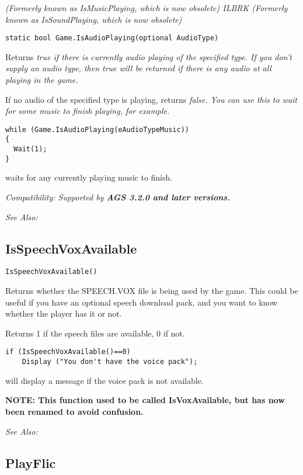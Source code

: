 \it{(Formerly known as IsMusicPlaying, which is now obsolete)} ILBRK
\it{(Formerly known as IsSoundPlaying, which is now obsolete)}

\begin{verbatim}
static bool Game.IsAudioPlaying(optional AudioType)
\end{verbatim}
Returns \it{true} if there is currently audio playing of the specified type. If you don't
supply an audio type, then \it{true} will be returned if there is any audio at all playing
in the game.

If no audio of the specified type is playing, returns \it{false}. You can use this to wait
for some music to finish playing, for example.

\begin{verbatim}
while (Game.IsAudioPlaying(eAudioTypeMusic))
{
  Wait(1);
}
\end{verbatim}
waits for any currently playing music to finish.

\it{Compatibility:} Supported by \bf{AGS 3.2.0} and later versions.

\it{See Also:} 


\subsection{IsSpeechVoxAvailable}\label{IsSpeechVoxAvailable}%

\begin{verbatim}
IsSpeechVoxAvailable()
\end{verbatim}
Returns whether the SPEECH.VOX file is being used by the game.
This could be useful if you have an optional speech download pack, and
you want to know whether the player has it or not.

Returns 1 if the speech files are available, 0 if not.

\begin{verbatim}
if (IsSpeechVoxAvailable()==0)
    Display ("You don't have the voice pack");
\end{verbatim}
will display a message if the voice pack is not available.

\bf{NOTE:} This function used to be called IsVoxAvailable, but has now been renamed to avoid confusion.

\it{See Also:} 


\subsection{PlayFlic}\label{PlayFlic}%

